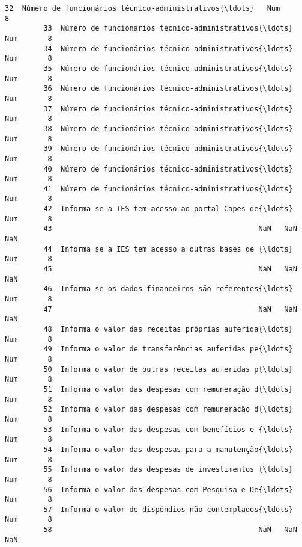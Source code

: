 \documentclass[11pt]{article}
\begin{document}
\begin{Verbatim}[commandchars=\\\{\}]
         32  Número de funcionários técnico-administrativos{\ldots}   Num       8   
         33  Número de funcionários técnico-administrativos{\ldots}   Num       8   
         34  Número de funcionários técnico-administrativos{\ldots}   Num       8   
         35  Número de funcionários técnico-administrativos{\ldots}   Num       8   
         36  Número de funcionários técnico-administrativos{\ldots}   Num       8   
         37  Número de funcionários técnico-administrativos{\ldots}   Num       8   
         38  Número de funcionários técnico-administrativos{\ldots}   Num       8   
         39  Número de funcionários técnico-administrativos{\ldots}   Num       8   
         40  Número de funcionários técnico-administrativos{\ldots}   Num       8   
         41  Número de funcionários técnico-administrativos{\ldots}   Num       8   
         42  Informa se a IES tem acesso ao portal Capes de{\ldots}   Num       8   
         43                                                NaN   NaN     NaN   
         44  Informa se a IES tem acesso a outras bases de {\ldots}   Num       8   
         45                                                NaN   NaN     NaN   
         46  Informa se os dados financeiros são referentes{\ldots}   Num       8   
         47                                                NaN   NaN     NaN   
         48  Informa o valor das receitas próprias auferida{\ldots}   Num       8   
         49  Informa o valor de transferências auferidas pe{\ldots}   Num       8   
         50  Informa o valor de outras receitas auferidas p{\ldots}   Num       8   
         51  Informa o valor das despesas com remuneração d{\ldots}   Num       8   
         52  Informa o valor das despesas com remuneração d{\ldots}   Num       8   
         53  Informa o valor das despesas com benefícios e {\ldots}   Num       8   
         54  Informa o valor das despesas para a manutenção{\ldots}   Num       8   
         55  Informa o valor das despesas de investimentos {\ldots}   Num       8   
         56  Informa o valor das despesas com Pesquisa e De{\ldots}   Num       8   
         57  Informa o valor de dispêndios não contemplados{\ldots}   Num       8   
         58                                                NaN   NaN     NaN   
         

\end{Verbatim}
\end{document}
